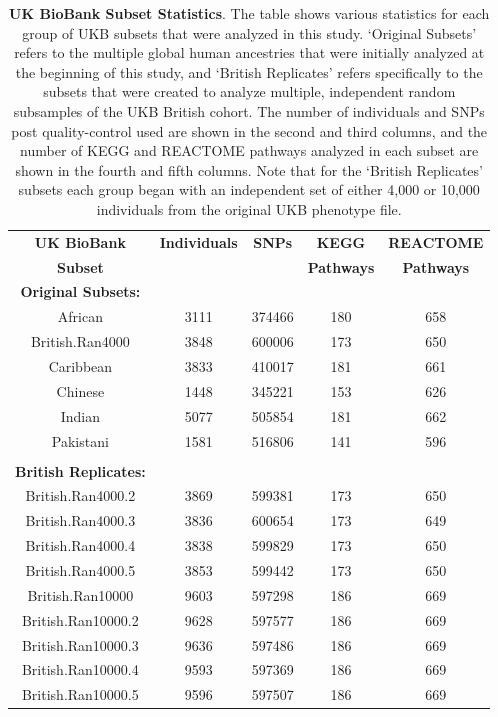 \documentclass[12pt, a4paper]{article}
\begin{document}
\begin{table}[ht]
\centering
\begin{tabular}{ccccc}
  \hline
\textbf{UK BioBank} & \textbf{Individuals} & \textbf{SNPs} & \textbf{KEGG} & \textbf{REACTOME} \\
\textbf{Subset} & & & \textbf{Pathways} & \textbf{Pathways}  \\
  \hline
\textbf{Original Subsets:} & & & & \\
African & 3111 & 374466 & 180 & 658 \\ 
British.Ran4000 & 3848 & 600006 & 173 & 650 \\ 
Caribbean & 3833 & 410017 & 181 & 661 \\ 
Chinese & 1448 & 345221 & 153 & 626 \\ 
Indian & 5077 & 505854 & 181 & 662 \\ 
Pakistani & 1581 & 516806 & 141 & 596 \\ 
\\
\textbf{British Replicates:} & & & & \\
British.Ran4000.2 & 3869 & 599381 & 173 & 650 \\ 
British.Ran4000.3 & 3836 & 600654 & 173 & 649 \\ 
British.Ran4000.4 & 3838 & 599829 & 173 & 650 \\ 
British.Ran4000.5 & 3853 & 599442 & 173 & 650 \\ 
British.Ran10000 & 9603 & 597298 & 186 & 669 \\ 
British.Ran10000.2 & 9628 & 597577 & 186 & 669 \\ 
British.Ran10000.3 & 9636 & 597486 & 186 & 669 \\ 
British.Ran10000.4 & 9593 & 597369 & 186 & 669 \\ 
British.Ran10000.5 & 9596 & 597507 & 186 & 669 \\ 
  \hline
\end{tabular}
\caption[TBD]{\textbf{UK BioBank Subset Statistics}. The table shows various statistics for each group of UKB subsets that were analyzed in this study. `Original Subsets' refers to the multiple global human ancestries that were initially analyzed at the beginning of this study, and `British Replicates' refers specifically to the subsets that were created to analyze multiple, independent random subsamples of the UKB British cohort. The number of individuals and SNPs post quality-control used are shown in the second and third columns, and the number of KEGG and REACTOME pathways analyzed in each subset are shown in the fourth and fifth columns. Note that for the `British Replicates' subsets each group began with an independent set of either 4,000 or 10,000 individuals from the original UKB phenotype file.}
\label{InterPath-Supp-Table-UKBPopStats}
\end{table}
\clearpage
\end{document}
